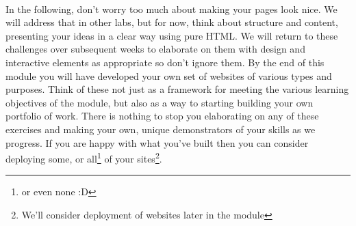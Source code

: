 \documentclass[10pt, a4paper, twosize]{article}
\begin{document}
\paragraph{} In the following, don't worry too much about making your pages look nice. We will address that in other labs, but for now, think about structure and content, presenting your ideas in a clear way using pure HTML. We will return to these challenges over subsequent weeks to elaborate on them with design and interactive elements as appropriate so don't ignore them. By the end of this module you will have developed your own set of websites of various types and purposes. Think of these not just as a framework for meeting the various learning objectives of the module, but also as a way to starting building your own portfolio of work. There is nothing to stop you elaborating on any of these exercises and making your own, unique demonstrators of your skills as we progress. If you are happy with what you've built then you can consider deploying some, or all\footnote{or even none :D} of your sites\footnote{We'll consider deployment of websites later in the module}.
\end{document}
